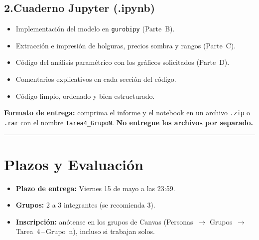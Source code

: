 \documentclass[12pt,a4paper]{article}
\begin{document}
\subsection*{2.\quad Cuaderno Jupyter (.ipynb)}

\begin{itemize}[topsep=2pt]
    \item Implementación del modelo en \texttt{gurobipy} (Parte~B).
    \item Extracción e impresión de holguras, precios sombra y rangos
          (Parte~C).
    \item Código del análisis paramétrico con los gráficos solicitados
          (Parte~D).
    \item Comentarios explicativos en cada sección del código.
    \item Código limpio, ordenado y bien estructurado.
\end{itemize}

\medskip
\noindent\textbf{Formato de entrega:} comprima el informe y el notebook en
un archivo \texttt{.zip} o \texttt{.rar} con el nombre
\texttt{Tarea4\_GrupoN}. \textbf{No entregue los archivos por separado.}

\noindent\rule{\linewidth}{0.4pt}

\section*{Plazos y Evaluación}

\begin{itemize}[topsep=2pt]
    \item \textbf{Plazo de entrega:} Viernes 15 de mayo a las 23:59.
    \item \textbf{Grupos:} 2 a 3 integrantes (se recomienda 3).
    \item \textbf{Inscripción:} anótense en los grupos de Canvas
          (Personas~$\to$ Grupos~$\to$ Tarea~4\,--\,Grupo~n), incluso
          si trabajan solos.
\end{itemize}

\vspace{0.5em}
\end{document}
